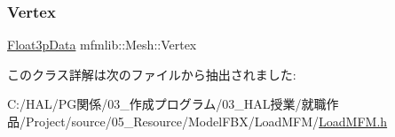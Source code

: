 \subsubsection{\texorpdfstring{Vertex}{Vertex}}
{\footnotesize\ttfamily \mbox{\hyperlink{classmfmlib_1_1_float3p_data}{Float3p\+Data}} mfmlib\+::\+Mesh\+::\+Vertex}



このクラス詳解は次のファイルから抽出されました\+:\begin{DoxyCompactItemize}
\item 
C\+:/\+H\+A\+L/\+P\+G関係/03\+\_\+作成プログラム/03\+\_\+\+H\+A\+L授業/就職作品/\+Project/source/05\+\_\+\+Resource/\+Model\+F\+B\+X/\+Load\+M\+F\+M/\mbox{\hyperlink{_load_m_f_m_8h}{Load\+M\+F\+M.\+h}}\end{DoxyCompactItemize}
